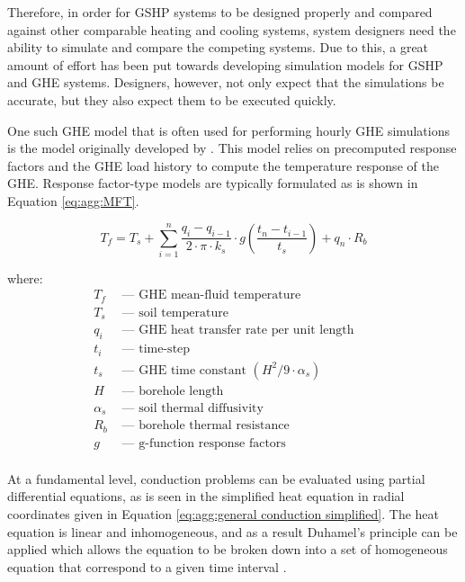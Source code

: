 \documentclass[review,12pt]{elsarticle}
\begin{document}
Therefore, in order for GSHP systems to be designed properly and compared against other comparable heating and cooling systems, system designers need the ability to simulate and compare the competing systems. Due to this, a great amount of effort has been put towards developing simulation models for GSHP and GHE systems. Designers, however, not only expect that the simulations be accurate, but they also expect them to be executed quickly.

One such GHE model that is often used for performing hourly GHE simulations is the model originally developed by \cite{EskilsonClaesson1988}. This model relies on precomputed response factors and the GHE load history to compute the temperature response of the GHE. Response factor-type models are typically formulated as is shown in Equation \ref{eq:agg:MFT}.

\begin{equation}
    T_f = T_s + \sum_{i=1}^n \frac{q_{i} - q_{i-1}}{2 \cdot \pi \cdot k_s} \cdot g\left(\frac{t_n - t_{i-1}}{t_s}\right) +  q_n \cdot R_b
    \label{eq:agg:MFT}
\end{equation}

where:
\begin{align*}
    T_f & \mbox{ --- GHE mean-fluid temperature} && \\
    T_s & \mbox{ --- soil temperature} && \\
    q_i & \mbox{ ---  GHE heat transfer rate per unit length} && \\
    t_i & \mbox{ --- time-step} && \\
    t_s & \mbox{ --- GHE time constant } \left(H^2 / 9\cdot\alpha_s\right) && \\
    H & \mbox{ --- borehole length} && \\
    \alpha_s & \mbox{ --- soil thermal diffusivity} && \\ 
    R_b & \mbox{ --- borehole thermal resistance} && \\
    g & \mbox{ --- g-function response factors} && \\
\end{align*}

At a fundamental level, conduction problems can be evaluated using partial differential equations, as is seen in the simplified heat equation in radial coordinates given in Equation \ref{eq:agg:general conduction simplified}. The heat equation is linear and inhomogeneous, and as a result Duhamel's principle can be applied which allows the equation to be broken down into a set of homogeneous equation that correspond to a given time interval \citep{Cullin2014}.
\end{document}
